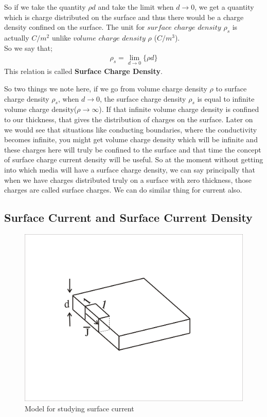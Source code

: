 So if we take the quantity $\rho d$ and take the limit when $d\rightarrow0$, we get a quantity which is charge distributed on the surface and thus there would be a charge density confined on the surface. The unit for $surface$ $charge$ $density$ $\rho_{s}$ is actually $C/m^{2}$ unlike $volume$ $charge$ $density$ $\rho$ ($C/m^{3}$).\\
So we say that;
\begin{align}
\rho_{s}=\lim_{d\rightarrow0}\{\rho d\} 
\end{align}
This relation is called \textbf{Surface Charge Density}.


So two things we note here, if we go from volume charge density $\rho$ to surface charge density $\rho_{s}$, when $d\rightarrow0$, the surface charge density $\rho_{s}$ is equal to infinite volume charge density($\rho\rightarrow\infty$). If that infinite volume charge density is confined to our thickness, that gives the distribution of charges on the surface. Later on we would see that situations like conducting boundaries, where the conductivity becomes infinite, you might get volume charge density which will be infinite and these charges here will truly be confined to the surface and that time the concept of surface charge current density will be useful. So at the moment without getting into which media will have a surface charge density, we can say principally that when we have charges distributed truly on a surface with zero thickness, those charges are called surface charges. We can do similar thing for current also.

\subsection{Surface Current and Surface Current Density}
\begin{figure}[h]
\centering
\includegraphics[width=0.7\linewidth]{./graphics/surfacecurrent}
\caption{Model for studying surface current}
\end{figure} 


